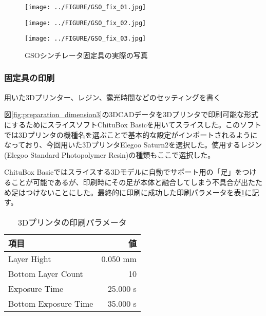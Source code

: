 \documentclass[../../main.tex]{subfiles}
\numberwithin{equation}{section}
\numberwithin{table}{section}
\numberwithin{figure}{section}
\begin{document}
  \begin{figure}[H]
    \begin{minipage}[b]{0.4\columnwidth}
      \centering
      \texttt{[image: ../FIGURE/GSO\_fix\_01.jpg]}
      \label{fig:preparation_GSO_fix_01}
    \end{minipage}
    \hspace{0.04\columnwidth} %
    \begin{minipage}[b]{0.4\columnwidth}
      \centering
      \texttt{[image: ../FIGURE/GSO\_fix\_02.jpg]}
      \label{fig:preparation_GSO_fix_02}
    \end{minipage}
    \begin{minipage}[b]{0.4\columnwidth}
      \centering
      \texttt{[image: ../FIGURE/GSO\_fix\_03.jpg]}
      \label{fig:preparation_GSO_fix_03}
    \end{minipage}
    \caption{GSOシンチレータ固定具の実際の写真}\label{fig:preparation_GSO_fix}
  \end{figure}

\subsubsection{固定具の印刷}
  用いた3Dプリンター、レジン、露光時間などのセッティングを書く

  図\ref{fig:preparation_dimension3}の3DCADデータを3Dプリンタで印刷可能な形式にするためにスライスソフトChituBox Basicを用いてスライスした。このソフトでは3Dプリンタの機種名を選ぶことで基本的な設定がインポートされるようになっており、今回用いた3DプリンタElegoo Saturn2を選択した。使用するレジン(Elegoo Standard Photopolymer Resin)の種類もここで選択した。

  ChituBox Basicではスライスする3Dモデルに自動でサポート用の「足」をつけることが可能であるが、印刷時にその足が本体と融合してしまう不具合が出たため足はつけないことにした。最終的に印刷に成功した印刷パラメータを表\ref{table:preparation_3Dprinter}に記す。
  \begin{table}[H]
    \begin{center}
      \caption{3Dプリンタの印刷パラメータ}\label{table:preparation_3Dprinter}
     \begin{tabular}{l|r}
       項目 & 値 \\\hline\hline
       Layer Hight & 0.050 \si{\milli\meter}  \\
       Bottom Layer Count & 10 \\
       Exposure Time & 25.000 \si{\second} \\
       Bottom Exposure Time & 35.000 \si{\second}
     \end{tabular}
    \end{center}
   \end{table}
\end{document}
